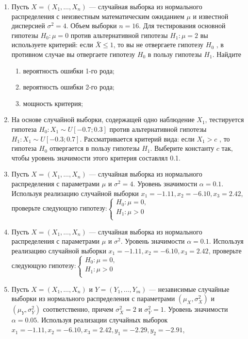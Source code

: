 \begin{enumerate}
\item Пусть $X = (X_{1}, \ldots, X_{n})$ — случайная выборка из нормального распределения
с неизвестным математическим ожиданием $\mu$ и известной дисперсией $\sigma^2 = 4$.
Объем выборки $n = 16$. Для тестирования основной гипотезы $H_{0}:\mu = 0$ против
альтернативной гипотезы $H_{1}:\mu = 2$ вы используете критерий: если $\bar{X} \leq 1$,
то вы не отвергаете гипотезу $H_{0}$ , в противном случае вы отвергаете гипотезу $H_{0}$ в пользу гипотезы $H_{1}$. Найдите

\begin{enumerate}
   \item  вероятность ошибки 1-го рода;
   \item вероятность ошибки 2-го рода;
   \item мощность критерия;
\end{enumerate}


\item На основе случайной выборки, содержащей одно наблюдение $X_{1}$,
тестируется гипотеза $H_{0} : X_{1} \sim U[-0.7;0.3]$ против альтернативной гипотезы $H_{1}: X_{1} \sim U[-0.3;0.7]$. Рассматривается критерий вида: если $X_{1} > c$ , то гипотеза $H_{0}$ отвергается в пользу гипотезы $H_{1}$. Выберите константу $c$ так, чтобы уровень значимости этого критерия составлял 0.1.

\item Пусть $X = (X_{1}, \ldots, X_{n})$ — случайная выборка из нормального распределения с параметрами $\mu$ и $\sigma^2 = 4$.
Уровень значимости  $\alpha = 0.1$. Используя
реализацию случайной выборки $x_{1} = -1.11, x_{2} = -6.10, x_{3} = 2.42$,
проверьте следующую гипотезу:$\begin{cases}
H_{0}:\mu = 0, \\
H_{1}:\mu > 0 \\
\end{cases}$

\item Пусть $X = (X_{1}, \ldots, X_{n})$ — случайная выборка из нормального
распределения с параметрами $\mu$ и $\sigma^2$. Уровень значимости  $\alpha = 0.1$. Используя
реализацию случайной выборки $x_{1} = -1.11, x_{2} = -6.10, x_{3} = 2.42$,
проверьте следующую гипотезу:$\begin{cases}
H_{0}:\mu = 0, \\
H_{1}:\mu > 0 \\
\end{cases}$

\item Пусть $X = (X_{1}, \ldots, X_{n})$ и $Y = (Y_{1}, \ldots, Y_{m})$ —
независимые случайные выборки из нормального распределения
с параметрами $(\mu_{X},\sigma^2_{X})$ и $(\mu_{Y},\sigma^2_{Y})$ соответственно,
причем  $\sigma^2_{X} = 2$ и $\sigma^2_{Y} = 1$. Уровень значимости $\alpha = 0.05$.
Используя реализации случайных выборок\newline
\hspace*{3cm}$x_{1} = -1.11, x_{2} = -6.10, x_{3} = 2.42, y_{1} = -2.29, y_{2} = -2.91$,


\end{enumerate}
